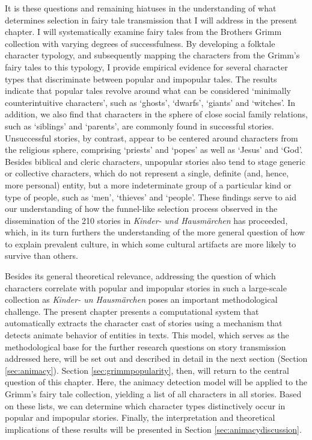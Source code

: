 It is these questions and remaining hiatuses in the understanding of what determines selection in fairy tale transmission that I will address in the present chapter. I will systematically examine fairy tales from the Brothers Grimm collection with varying degrees of successfulness. By developing a folktale character typology, and subsequently mapping the characters from the Grimm's fairy tales to this typology, I provide empirical evidence for several character types that discriminate between popular and impopular tales. The results indicate that popular tales revolve around what can be considered `minimally counterintuitive characters', such as `ghosts', `dwarfs', `giants' and `witches'. In addition, we also find that characters in the sphere of close social family relations, such as `siblings' and `parents', are commonly found in successful stories. Unsuccessful stories, by contrast, appear to be centered around characters from the religious sphere, comprising `priests' and `popes' as well as `Jesus' and `God'. Besides biblical and cleric characters, unpopular stories also tend to stage generic or collective characters, which do not represent a single, definite (and, hence, more personal) entity, but a more indeterminate group of a particular kind or type of people, such as `men', `thieves' and `people'. These findings serve to aid our understanding of how the funnel-like selection process observed in the dissemination of the 210 stories in \emph{Kinder- und Hausmärchen} has proceeded, which, in its turn furthers the understanding of the more general question of how to explain prevalent culture, in which some cultural artifacts are more likely to survive than others.

Besides its general theoretical relevance, addressing the question of which characters correlate with popular and impopular stories in such a large-scale collection as \emph{Kinder- un Hausmärchen} poses an important methodological challenge. The present chapter presents a computational system that automatically extracts the character cast of stories using a mechanism that detects animate behavior of entities in texts. This model, which serves as the methodological base for the further research questions on story transmission addressed here, will be set out and described in detail in the next section (Section \ref{sec:animacy}). Section \ref{sec:grimmpopularity}, then, will return to the central question of this chapter. Here, the animacy detection model will be applied to the Grimm's fairy tale collection, yielding a list of all characters in all stories. Based on these lists, we can determine which character types distinctively occur in popular and impopular stories. Finally, the interpretation and theoretical implications of these results will be presented in Section \ref{sec:animacydiscussion}.


